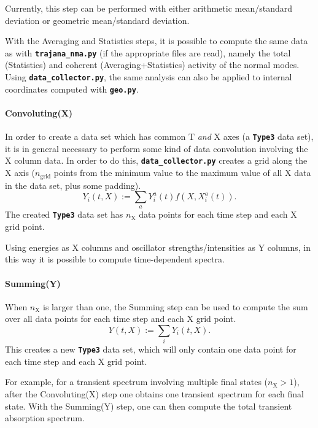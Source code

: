 \documentclass[a4paper,10pt,DIV=15,openany,twoside=false]{scrbook}
\newcommand{\todo}[1]{\textcolor{RL}{#1}}
\newcommand{\ttt}[1]{\textbf{\texttt{#1}}}
\begin{document}
Currently, this step can be performed with either arithmetic mean/standard deviation or geometric mean/standard deviation.

With the Averaging and Statistics steps, it is possible to compute the same data as with \ttt{trajana\_nma.py} (if the appropriate files are read), namely the total (Statistics) and coherent (Averaging+Statistics) activity of the normal modes.
Using \ttt{data\_collector.py}, the same analysis can also be applied to internal coordinates computed with \ttt{geo.py}.

\paragraph{Convoluting(X)}

In order to create a data set which has common T \emph{and} X axes (a \ttt{Type3} data set), it is in general necessary to perform some kind of data convolution involving the X column data.
In order to do this, \ttt{data\_collector.py} creates a grid along the X axis ($n_\text{grid}$ points from the minimum value to the maximum value of all X data in the data set, plus some padding).
\begin{equation}
  Y_i(t,X):=\sum_a Y_i^a(t) f(X,X_i^a(t)).
\end{equation}
The created \ttt{Type3} data set has $n_\text{X}$ data points for each time step and each X grid point.

Using energies as X columns and oscillator strengths/intensities as Y columns, in this way it is possible to compute time-dependent spectra.

\paragraph{Summing(Y)}

When $n_\text{X}$ is larger than one, the Summing step can be used to compute the sum over all data points for each time step and each X grid point.
\begin{equation}
  Y(t,X):=\sum_i Y_i(t,X).
\end{equation}
This creates a new \ttt{Type3} data set, which will only contain one data point for each time step and each X grid point.

For example, for a transient spectrum involving multiple final states ($n_\text{X}>1$), after the Convoluting(X) step one obtains one transient spectrum for each final state. With the Summing(Y) step, one can then compute the total transient absorption spectrum.
\end{document}
